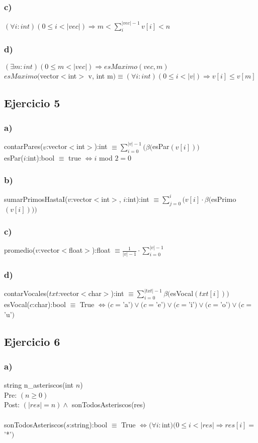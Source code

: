 \documentclass[12 pt]{article}
\begin{document}
    \subsubsection*{c)}
        $(\forall i:int)(0 \leq i < |vec|) \Rightarrow m < \sum_{i}^{|vec|-1} v[i] < n$
    \subsubsection*{d)}
        $(\exists m:int)(0 \leq m < |vec|) \Rightarrow esMaximo(vec, m)$\\
        $esMaximo($vector$<$int$>$ v, int m$) \equiv (\forall i:int)(0 \leq i < |v|) \Rightarrow v[i] \leq v[m]$

\subsection*{Ejercicio 5}
    \subsubsection*{a)}
        contarPares($v$:vector$<$int$>$):int $\equiv \sum^{|v|-1}_{i=0}(\beta($esPar$(v[i]))$\\
        esPar($i$:int):bool $\equiv$ true $\Leftrightarrow i$ mod $2 = 0$
    \subsubsection*{b)}
        sumarPrimosHastaI($v$:vector$<$int$>$, $i$:int):int $\equiv \sum^{i}_{j=0}(v[i] \cdot \beta($esPrimo$(v[i])))$
    \subsubsection*{c)}
        promedio($v$:vector$<$float$>$):float $\equiv \frac{1}{|v|-1} \cdot \sum^{|v|-1}_{i=0}$
    \subsubsection*{d)}
        contarVocales($txt$:vector$<$char$>$):int $\equiv \sum^{|txt|-1}_{i=0}\beta($esVocal$(txt[i]))$\\
        esVocal($c$:char):bool $\equiv$ True $\Leftrightarrow (c =$'a'$)\vee(c =$'e'$)\vee(c =$'i'$)\vee(c =$'o'$)\vee(c =$'u'$)$

\subsection*{Ejercicio 6}
    \subsubsection*{a)}
        string n\_asteriscos(int $n$)\\
        Pre: $(n \geq 0)$\\
        Post: $(|res| = n) \wedge$ sonTodosAsteriscos(res)\\
        \\
        sonTodosAsteriscos($s$:string):bool $\equiv$ True $\Leftrightarrow (\forall i:$int$)(0 \leq i < |res| \Rightarrow res[i] =$'*'$)$
\end{document}
